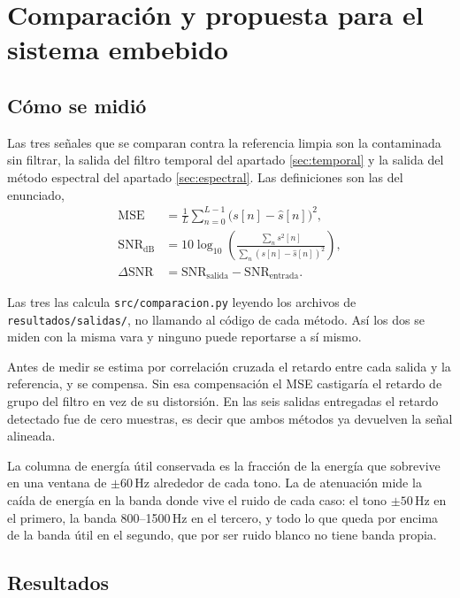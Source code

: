 
\section{Comparación y propuesta para el sistema embebido}
\label{sec:comparacion}

\subsection{Cómo se midió}

Las tres señales que se comparan contra la referencia limpia son la contaminada
sin filtrar, la salida del filtro temporal del apartado \ref{sec:temporal} y la
salida del método espectral del apartado \ref{sec:espectral}. Las definiciones
son las del enunciado,
\begin{align}
\mathrm{MSE} &= \frac{1}{L}\sum_{n=0}^{L-1}\bigl(s[n]-\hat{s}[n]\bigr)^2,\\
\mathrm{SNR}_{\mathrm{dB}} &= 10\log_{10}
  \left(\frac{\sum_{n} s^2[n]}{\sum_{n}(s[n]-\hat{s}[n])^2}\right),\\
\Delta\mathrm{SNR} &= \mathrm{SNR}_{\mathrm{salida}}-\mathrm{SNR}_{\mathrm{entrada}}.
\end{align}

Las tres las calcula \texttt{src/comparacion.py} leyendo los archivos de
\texttt{resultados/salidas/}, no llamando al código de cada método. Así los dos
se miden con la misma vara y ninguno puede reportarse a sí mismo.

Antes de medir se estima por correlación cruzada el retardo entre cada salida y
la referencia, y se compensa. Sin esa compensación el MSE castigaría el retardo
de grupo del filtro en vez de su distorsión. En las seis salidas entregadas el
retardo detectado fue de cero muestras, es decir que ambos métodos ya devuelven
la señal alineada.

La columna de energía útil conservada es la fracción de la energía que sobrevive
en una ventana de $\pm 60$\,Hz alrededor de cada tono. La de atenuación mide la
caída de energía en la banda donde vive el ruido de cada caso: el tono $\pm
50$\,Hz en el primero, la banda 800--1500\,Hz en el tercero, y todo lo que queda
por encima de la banda útil en el segundo, que por ser ruido blanco no tiene
banda propia.

\subsection{Resultados}

